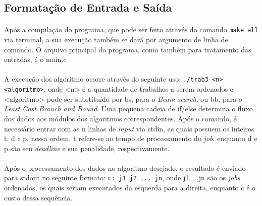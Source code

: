 \documentclass[12pt,a4paper]{article}
\begin{document}
  \subsection{Formatação de Entrada e Saída}
   {\paragraph{} Após a compilação do programa, que pode ser feito através do comando {\tt make all} via terminal, a sua execução também se dará por argumento de linha de comando. O arquivo principal do programa, como também para tratamento das entradas, é o main.c}
   {\paragraph{} A execução dos algoritmo ocorre através do seguinte uso: {\tt ./trab3 <n> <algoritmo>}, onde <n> é a quantidade de trabalhos a serem ordenados e <algoritmo> pode ser substituído por bs, para o {\it Beam search}, ou bb, para o {\it Least Cost Branch and Bound}. Uma pequena cadeia de if/else determina o fluxo dos dados aos módulos dos algoritmos correspondentes. Após o comando, é necessário entrar com as n linhas de {\it input} via stdin, as quais possuem os inteiros t, d e p, nessa ordem. t refere-se ao tempo de processamento do {\it job}, enquanto d e p são seu {\it deadline} e sua penalidade, respectivamente. }
   {\paragraph{} Após o processamento dos dados no algoritmo desejado, o resultado é enviado para stdout no seguinte formato: {\tt c: j1 j2 ... jn}, onde j1,...,jn são os {\it jobs} ordenados, os quais seriam executados da esquerda para a direita, enquanto c é o custo dessa sequência. } 
  
\end{document}
